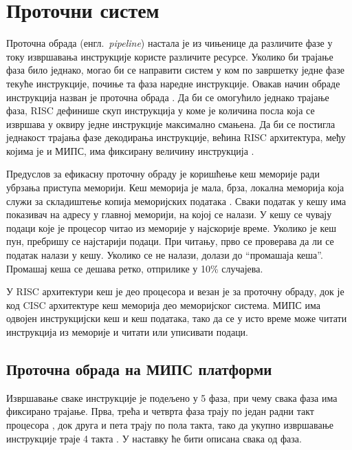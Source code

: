 \documentclass[12pt,oneside]{memoir}
\begin{document}
\section{Проточни систем}
\label{sec:pipeline}
Проточна обрада (енгл.~\textit{pipeline}) настала је из чињенице да различите фазе у току извршавања инструкције користе различите ресурсе. Уколико би трајање фаза било једнако, могао би се направити систем у ком по завршетку једне фазе текуће инструкције, почиње та фаза наредне инструкције. Овакав начин обраде инструкција назван је проточна обрада \cite{mips}. Да би се омогућило једнако трајање фаза, RISC дефинише скуп инструкција у коме је количина посла која се извршава у оквиру једне инструкције максимално смањена. Да би се постигла једнакост трајања фазе декодирања инструкције, већина RISC архитектура, међу којима је и МИПС, има фиксирану величину инструкција \cite{mips}.

Предуслов за ефикасну проточну обраду је коришћење кеш меморије ради убрзања приступа меморији. Кеш меморија је мала, брза, локална меморија која служи за складиштење копија меморијских података \cite{mips}. Сваки податак у кешу има показивач на адресу у главној меморији, на којој се налази. У кешу се чувају подаци које је процесор читао из меморије у најскорије време. Уколико је кеш пун, пребришу се најстарији подаци. При читању, прво се проверава да ли се податак налази у кешу. Уколико се не налази, долази до “промашаја кеша”. Промашај кеша се дешава ретко, отприлике у 10\% случајева.

У RISC архитектури кеш је део процесора и везан је за проточну обраду, док је код CISC архитектуре кеш меморија део меморијског система. МИПС има одвојен инструкцијски кеш и кеш података, тако да се у исто време може читати инструкција из меморије и читати или уписивати подаци. 

\subsection{Проточна обрада на МИПС платформи}

Извршавање сваке инструкције је подељено у 5 фаза, при чему свака фаза има фиксирано трајање. Прва, трећа и четврта фаза трају по један радни такт процесора , док друга и пета трају по пола такта, тако да укупно извршавање инструкције траје 4 такта \cite{mips}. У наставку ће бити описана свака од фаза.
\end{document}
